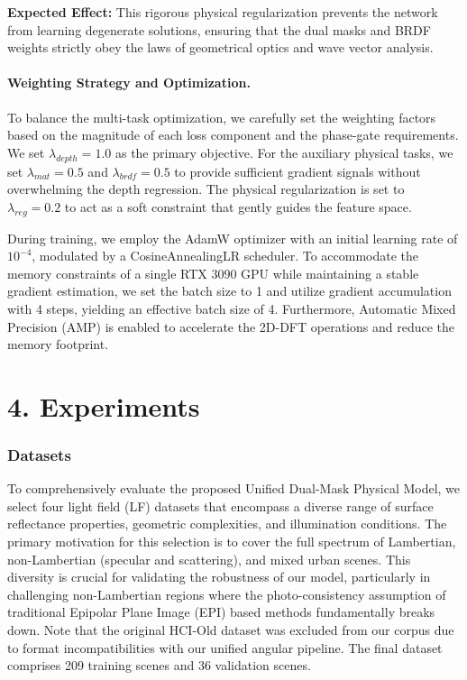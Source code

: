 \documentclass[lettersize,journal]{IEEEtran}
\begin{document}
\textbf{Expected Effect:} This rigorous physical regularization prevents the network from learning degenerate solutions, ensuring that the dual masks and BRDF weights strictly obey the laws of geometrical optics and wave vector analysis.

\paragraph{Weighting Strategy and Optimization.}
To balance the multi-task optimization, we carefully set the weighting factors based on the magnitude of each loss component and the phase-gate requirements. We set $\lambda_{depth} = 1.0$ as the primary objective. For the auxiliary physical tasks, we set $\lambda_{mat} = 0.5$ and $\lambda_{brdf} = 0.5$ to provide sufficient gradient signals without overwhelming the depth regression. The physical regularization is set to $\lambda_{reg} = 0.2$ to act as a soft constraint that gently guides the feature space.

During training, we employ the AdamW optimizer with an initial learning rate of $10^{-4}$, modulated by a CosineAnnealingLR scheduler. To accommodate the memory constraints of a single RTX 3090 GPU while maintaining a stable gradient estimation, we set the batch size to 1 and utilize gradient accumulation with 4 steps, yielding an effective batch size of 4. Furthermore, Automatic Mixed Precision (AMP) is enabled to accelerate the 2D-DFT operations and reduce the memory footprint.


\section{4. Experiments}

\subsubsection{Datasets}

To comprehensively evaluate the proposed Unified Dual-Mask Physical Model, we select four light field (LF) datasets that encompass a diverse range of surface reflectance properties, geometric complexities, and illumination conditions. The primary motivation for this selection is to cover the full spectrum of Lambertian, non-Lambertian (specular and scattering), and mixed urban scenes. This diversity is crucial for validating the robustness of our model, particularly in challenging non-Lambertian regions where the photo-consistency assumption of traditional Epipolar Plane Image (EPI) based methods fundamentally breaks down. Note that the original HCI-Old dataset was excluded from our corpus due to format incompatibilities with our unified angular pipeline. The final dataset comprises 209 training scenes and 36 validation scenes.
\end{document}
